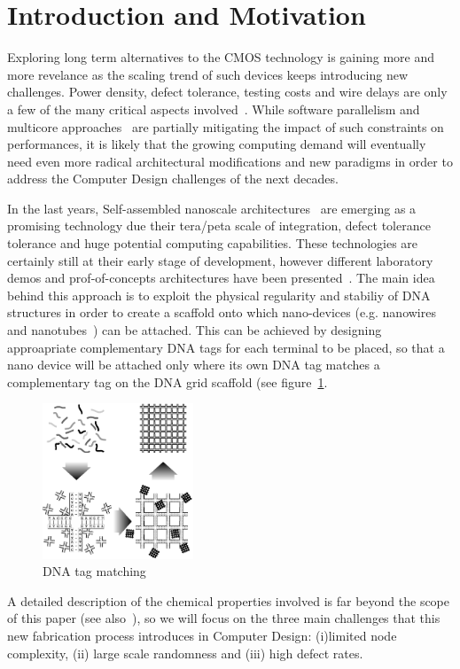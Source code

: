 
\section{Introduction and Motivation}

Exploring long term alternatives to the CMOS technology is gaining
more and more revelance as the scaling trend of such devices keeps
introducing new challenges. Power density, defect tolerance, testing
costs and wire delays are only a few of the many critical aspects
involved~\cite{itrs12}. While software parallelism and multicore
approaches~\cite{horowitz2004, mudge2001, powell2009} are partially mitigating the impact of such
constraints on performances, it is likely that the growing computing demand will
eventually need even more radical architectural modifications and new
paradigms in order to address the Computer Design challenges of the next
decades.

In the last years, Self-assembled nanoscale architectures~\cite{winfree1998, yan2003}
are emerging as a promising technology due their tera/peta scale of
integration, defect tolerance tolerance and huge potential computing
capabilities. These technologies are certainly still at
their early stage of development, however different laboratory demos and
prof-of-concepts architectures have been presented~\cite{patwardhan2004, patwardhan2006, patwardhan2006_1, pistol2009}.
The main idea behind this approach is to exploit the physical regularity and
stabiliy of DNA structures in order to create a scaffold onto which
nano-devices (e.g. nanowires and nanotubes~\cite{bachtold2001, tans1998, cui2001}) can be
attached. This can be achieved by designing approapriate complementary DNA tags for
each terminal to be placed, so that a nano device will be attached
only where its own DNA tag matches a complementary tag on the DNA grid
scaffold (see figure~\ref{fig:dna_tag}.
\begin{figure}
  \centering
    \includegraphics[width=0.40\textwidth]{pictures/dna2b.eps}
  \caption{DNA tag matching}
  \label{fig:dna_tag}
\end{figure}
A detailed description of the chemical properties involved is far
beyond the scope of this paper (see also~\cite{braun1998, seeman1999}), so we will focus on
the three main challenges that this new fabrication process introduces
in Computer Design: (i)limited node complexity, (ii) large scale
randomness and (iii) high defect rates.  

